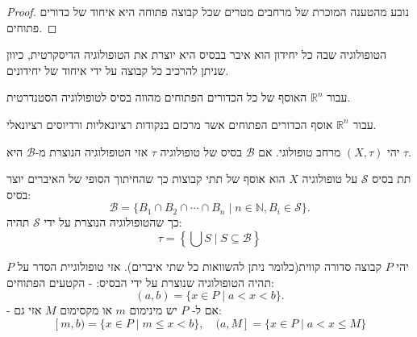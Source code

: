 \documentclass{tstextbook}
\begin{document}
\begin{proof}
נובע מהטענה המוכרת של מרחבים מטרים שכל קבוצה פתוחה היא איחוד של כדורים פתוחים.

\end{proof}
\begin{example}
הטופולוגיה שבה כל יחידון הוא איבר בבסיס היא יוצרת את הטופולוגיה הדיסקרטית, כיוון שניתן להרכיב כל קבוצה על ידי איחוד של יחידונים.

\end{example}
\begin{example}
עבור \(\mathbb{R}^{n}\) האוסף של כל הכדורים הפתוחים מהווה בסיס לטופולוגיה הסטנדרטית.

\end{example}
\begin{example}
עבור \(\mathbb{R}^{n}\) אוסף הכדורים הפתוחים אשר מרכזם בנקודות רציונאליות ורדיוסים רציונאלי.

\end{example}
\begin{proposition}
יהי \(\left( X,\tau \right)\) מרחב טופולוגי. אם \(\mathcal{B}\) בסיס של טופולוגיה \(\tau\) אזי הטופולוגיה הנוצרת מ-\(\mathcal{B}\) היא \(\tau\).

\end{proposition}
\begin{definition}[תת בסיס]
תת בסיס \(\mathcal{S}\) על טופולוגיה \(X\) הוא אוסף של תתי קבוצות כך שהחיתוך הסופי של האיברים יוצר בסיס:
$${\mathcal{B}}=\{B_{1}\cap B_{2}\cap\cdots\cap B_{n}\mid n\in\mathbb{N},B_{i}\in{\mathcal{S}}\}.$$
כך שהטופולוגיה הנוצרת על ידי \(\mathcal{S}\) תהיה:
$$\tau=\left\{\bigcup S\mid S\subseteq\mathcal{B}\right\}$$

\end{definition}
\begin{definition}
יהי \(P\) קבוצה סדורה קווית(כלומר ניתן להשוואות כל שתי איברים). אזי טופולוגיית הסדר על \(P\) תהיה הטופולוגיה שנוצרת על ידי הבסיס:
- הקטעים הפתוחים:
$$(a,b)=\{x\in P\mid a<x<b\}.$$
- אם ל- \(P\) יש מינימום \(m\) או מקסימום \(M\) אזי גם:
$$[m,b)=\{x\in P\mid m\leq x<b\},\quad(a,M]=\{x\in P\mid a<x\leq M\}$$

\end{definition}
\end{document}
